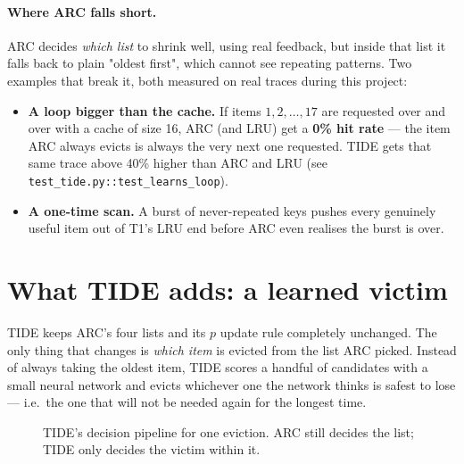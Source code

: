 \documentclass[10pt,a4paper]{article}
\newcommand{\code}[1]{\texttt{#1}}
\begin{document}
\paragraph{Where ARC falls short.} ARC decides \emph{which list} to shrink well, using real feedback, but
inside that list it falls back to plain "oldest first", which cannot see repeating patterns. Two examples
that break it, both measured on real traces during this project:
\begin{itemize}
  \item \textbf{A loop bigger than the cache.} If items $1, 2, \dots, 17$ are requested over and over
        with a cache of size 16, ARC (and LRU) get a \textbf{0\% hit rate} — the item ARC always evicts
        is always the very next one requested. TIDE gets that same trace above 40\% higher than ARC and
        LRU (see \code{test\_tide.py::test\_learns\_loop}).
  \item \textbf{A one-time scan.} A burst of never-repeated keys pushes every genuinely useful item out
        of T1's LRU end before ARC even realises the burst is over.
\end{itemize}

\section{What TIDE adds: a learned victim}
TIDE keeps ARC's four lists and its $p$ update rule completely unchanged. The only thing that changes is
\emph{which item} is evicted from the list ARC picked. Instead of always taking the oldest item, TIDE
scores a handful of candidates with a small neural network and evicts whichever one the network thinks
is safest to lose --- i.e.\ the one that will not be needed again for the longest time.

\begin{figure}[H]
\centering
{}
\caption{TIDE's decision pipeline for one eviction. ARC still decides the list; TIDE only decides the
victim within it.}
\end{figure}
\end{document}
